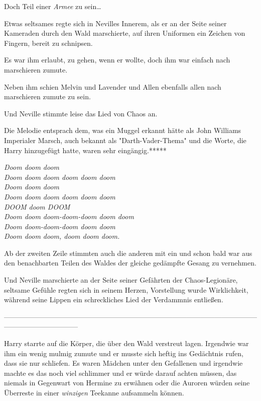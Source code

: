 {Doch Teil einer \emph{Armee} zu sein…

Etwas seltsames regte sich in Nevilles Innerem, als er an der Seite seiner Kameraden durch den Wald marschierte, auf ihren Uniformen ein Zeichen von Fingern, bereit zu schnipsen.

Es war ihm erlaubt, zu gehen, wenn er wollte, doch ihm war einfach nach marschieren zumute.

Neben ihm schien Melvin und Lavender und Allen ebenfalls allen nach marschieren zumute zu sein.

Und Neville stimmte leise das Lied von Chaos an.

Die Melodie entsprach dem, was ein Muggel erkannt hätte als John Williams Imperialer Marsch, auch bekannt als "Darth-Vader-Thema" und die Worte, die Harry hinzugefügt hatte, waren sehr eingängig.*****

\emph{Doom doom doom\\ Doom doom doom doom doom doom\\ Doom doom doom\\ Doom doom doom doom doom doom\\ DOOM doom DOOM\\ Doom doom doom-doom-doom doom doom\\ Doom doom-doom-doom doom doom\\ Doom doom doom, doom doom doom.}

Ab der zweiten Zeile stimmten auch die anderen mit ein und schon bald war aus den benachbarten Teilen des Waldes der gleiche gedämpfte Gesang zu vernehmen.

Und Neville marschierte an der Seite seiner Gefährten der Chaos-Legionäre, seltsame Gefühle regten sich in seinem Herzen, Vorstellung wurde Wirklichkeit, während seine Lippen ein schreckliches Lied der Verdammnis entließen.

--------------------------------------------------------------------------------------------------------------------------------------------

Harry starrte auf die Körper, die über den Wald verstreut lagen. Irgendwie war ihm ein wenig mulmig zumute und er musste sich heftig ins Gedächtnis rufen, dass sie nur schliefen. Es waren Mädchen unter den Gefallenen und irgendwie machte es das noch viel schlimmer und er würde darauf achten müssen, das niemals in Gegenwart von Hermine zu erwähnen oder die Auroren würden seine Überreste in einer \emph{winzigen} Teekanne aufsammeln können.

}
